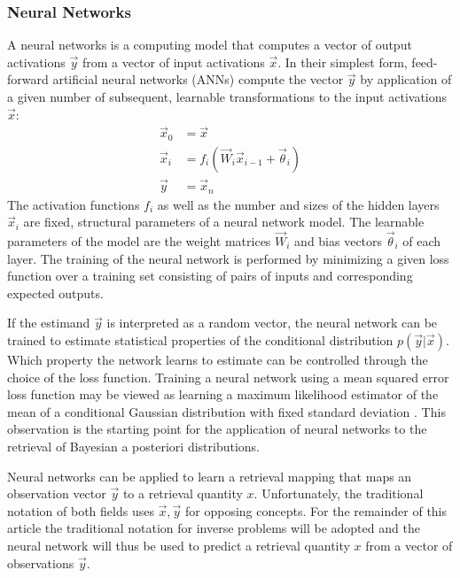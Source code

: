 \documentclass[journal abbreviation, manuscript]{copernicus}
\begin{document}
\subsubsection{Neural Networks}

  A neural networks is a computing model that computes a vector of output
  activations $\vec{y}$ from a vector of input activations $\vec{x}$. In their
  simplest form, feed-forward artificial neural networks (ANNs) compute the
  vector $\vec{y}$ by application of a given number of subsequent, learnable
  transformations to the input activations $\vec{x}$:
    \begin{align}
        \vec{x}_0 &= \vec{x}\\
        \vec{x}_i &= f_{i}
        \left ( \vec{W}_{i} \vec{x}_{i - 1}+ \vec{\theta}_i \right ) \\
        \vec{y} &= \vec{x}_{n}
    \end{align}
    The activation functions $f_i$ as well as the number and sizes of the
    hidden layers $\vec{x}_i$ are fixed, structural parameters of a neural
    network model. The learnable parameters of the model are the weight
    matrices $\vec{W}_i$ and bias vectors $\vec{\theta}_i$ of each layer. The
    training of the neural network is performed by minimizing a given loss
    function over a training set consisting of pairs of inputs and corresponding
    expected outputs.

    If the estimand $\vec{y}$ is interpreted as a random vector, the neural
    network can be trained to estimate statistical properties of the conditional
    distribution $p(\vec{y} | \vec{x})$. Which property the network learns to
    estimate can be controlled through the choice of the loss function. Training a
    neural network using a mean squared error loss function may be viewed as
    learning a maximum likelihood estimator of the mean of a conditional
    Gaussian distribution with fixed standard deviation \citep{bishop_mdn}.
    This observation is the starting point for the application of neural networks
    to the retrieval of Bayesian a posteriori distributions.

    Neural networks can be applied to learn a retrieval mapping
    that maps an observation vector $\vec{y}$ to a retrieval quantity $x$.
    Unfortunately, the traditional notation of both fields uses $\vec{x}, \vec{y}$
    for opposing concepts. For the remainder of this article the
    traditional notation for inverse problems will be adopted and the neural network
    will thus be used to predict a retrieval quantity $x$ from a vector of
    observations $\vec{y}$.
\end{document}
